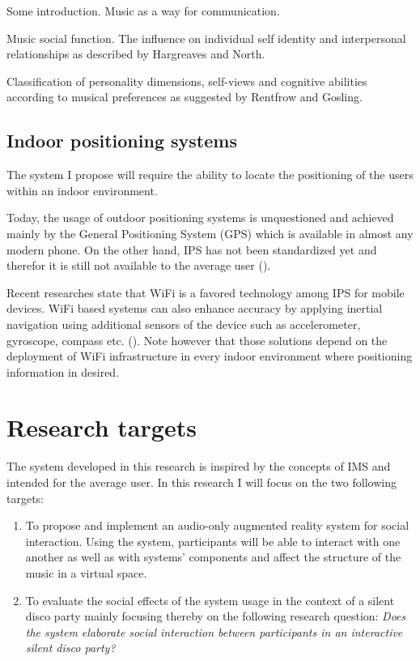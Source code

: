 \documentclass[a4paper,11pt]{article}
\begin{document}

Some introduction.
Music as a way for communication.

Music social function.
The influence on individual self identity and interpersonal relationships as described by Hargreaves and North.

Classification of personality dimensions, self-views and cognitive abilities according to musical preferences as suggested by Rentfrow and Gosling.

\subsection{Indoor positioning systems}

The system I propose will require the ability to locate the positioning of the users within an indoor environment.

Today, the usage of outdoor positioning systems is unquestioned and achieved mainly by the General Positioning System (GPS) which is available in almost any modern phone.
On the other hand, IPS has not been standardized yet and therefor it is still not available to the average user (\cite{web:turetsky}).

Recent researches state that WiFi is a favored technology among IPS for mobile devices.
WiFi based systems can also enhance accuracy by applying inertial navigation using additional sensors of the device such as accelerometer, gyroscope, compass etc. (\cite{web:harrop}).
Note however that those solutions depend on the deployment of WiFi infrastructure in every indoor environment where positioning information in desired.

\section{Research targets}

The system developed in this research is inspired by the concepts of IMS and intended for the average user. In this research I will focus on the two following targets:
\begin{enumerate}
	\item To propose and implement an audio-only augmented reality system for social interaction.
	Using the system, participants will be able to interact with one another as well as with systems' components and affect the structure of the music in a virtual space.
	\item To evaluate the social effects of the system usage in the context of a silent disco party mainly focusing thereby on the following research question: \emph{Does the system elaborate social interaction between participants in an interactive silent disco party?}
\end{enumerate}
\end{document}
